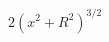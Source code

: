 \documentclass[preview]{standalone}
\begin{document}
\begin{align*}
{{2 {(x^2 + R^2)^{3/2}}}}
\end{align*}
\end{document}
